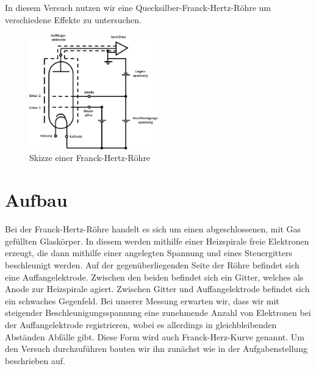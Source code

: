 In diesem Versuch nutzen wir eine Quecksilber-Franck-Hertz-Röhre um verschiedene Effekte zu untersuchen.
\begin{figure}
	\centering
	\includegraphics[width=0.5\textwidth]{../Daten/Aufgabe1/Aufbau.png}
	\caption{Skizze einer Franck-Hertz-Röhre \cite{FHR}}
\end{figure}
\section{Aufbau}
Bei der Franck-Hertz-Röhre handelt es sich um einen abgeschlossenen, mit Gas gefüllten Glaskörper. In diesem werden mithilfe einer Heizspirale freie Elektronen erzeugt, die dann mithilfe einer angelegten Spannung und eines Steuergitters beschleunigt werden. Auf der gegenüberliegenden Seite der Röhre befindet sich eine Auffangelektrode. Zwischen den beiden befindet sich ein Gitter, welches als Anode zur Heizspirale agiert. Zwischen Gitter und Auffangelektrode befindet sich ein schwaches Gegenfeld. Bei unserer Messung erwarten wir, dass wir mit steigender Beschleunigungsspannung eine zunehmende Anzahl von Elektronen bei der Auffangelektrode registrieren, wobei es allerdings in gleichbleibenden Abständen Abfälle gibt. Diese Form wird auch Franck-Herz-Kurve genannt. Um den Versuch durchzuführen bauten wir ihn zunächst wie in der Aufgabenstellung beschrieben auf.
